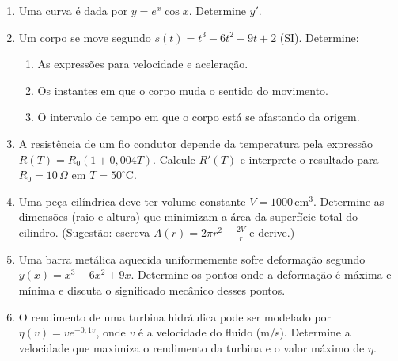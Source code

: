 \documentclass[12pt,a4paper]{article}
\begin{document}
\begin{enumerate}
    \item Uma curva é dada por $y = e^x \cos x$. Determine $y'$.

   \item Um corpo se move segundo $s(t) = t^3 - 6t^2 + 9t + 2$ (SI).  
    Determine:
    \begin{enumerate}
        \item As expressões para velocidade e aceleração.  
        \item Os instantes em que o corpo muda o sentido do movimento.  
        \item O intervalo de tempo em que o corpo está se afastando da origem.
    \end{enumerate}

    \item A resistência de um fio condutor depende da temperatura pela expressão $R(T) = R_0(1 + 0{,}004T)$.  
    Calcule $R'(T)$ e interprete o resultado para $R_0 = 10\,\Omega$ em $T = 50^\circ$C.

    \item Uma peça cilíndrica deve ter volume constante $V = 1000\,\text{cm}^3$.  
    Determine as dimensões (raio e altura) que minimizam a área da superfície total do cilindro.  
    (Sugestão: escreva $A(r) = 2\pi r^2 + \frac{2V}{r}$ e derive.)

    \item Uma barra metálica aquecida uniformemente sofre deformação segundo $y(x) = x^3 - 6x^2 + 9x$.  
    Determine os pontos onde a deformação é máxima e mínima e discuta o significado mecânico desses pontos.

    \item O rendimento de uma turbina hidráulica pode ser modelado por $\eta(v) = v e^{-0{,}1v}$, onde $v$ é a velocidade do fluido (m/s).  
    Determine a velocidade que maximiza o rendimento da turbina e o valor máximo de $\eta$.



\end{enumerate}

  
\end{document}
